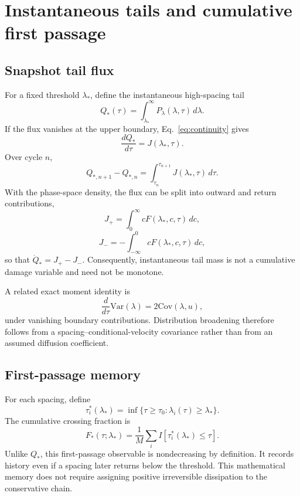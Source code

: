 \documentclass[11pt]{article}
\newcommand{\Var}{\mathrm{Var}}
\newcommand{\Cov}{\mathrm{Cov}}
\begin{document}
\section{Instantaneous tails and cumulative first passage}
\subsection{Snapshot tail flux}
For a fixed threshold \(\lambda_*\), define the instantaneous high-spacing tail
\begin{equation}
Q_*(\tau)=\int_{\lambda_*}^{\infty}P_\lambda(\lambda,\tau)\,d\lambda.
\end{equation}
If the flux vanishes at the upper boundary, Eq.~\eqref{eq:continuity} gives
\begin{equation}
\frac{dQ_*}{d\tau}=J(\lambda_*,\tau).
\label{eq:tailflux}
\end{equation}
Over cycle \(n\),
\begin{equation}
Q_{*,n+1}-Q_{*,n}
=\int_{\tau_n}^{\tau_{n+1}}J(\lambda_*,\tau)\,d\tau.
\label{eq:cycletail}
\end{equation}
With the phase-space density, the flux can be split into outward and return contributions,
\begin{equation}
J_+=\int_0^\infty cF(\lambda_*,c,\tau)\,dc,
\end{equation}
\begin{equation}
J_-=-\int_{-\infty}^0 cF(\lambda_*,c,\tau)\,dc,
\end{equation}
so that \(\dot Q_*=J_+-J_-\). Consequently, instantaneous tail mass is not a cumulative damage variable and need not be monotone.

A related exact moment identity is
\begin{equation}
\frac{d}{d\tau}\Var(\lambda)
=2\Cov(\lambda,u),
\end{equation}
under vanishing boundary contributions. Distribution broadening therefore follows from a spacing--conditional-velocity covariance rather than from an assumed diffusion coefficient.

\subsection{First-passage memory}
For each spacing, define
\begin{equation}
\tau_i^*(\lambda_*)
=\inf\{\tau\ge\tau_0:\lambda_i(\tau)\ge\lambda_*\}.
\end{equation}
The cumulative crossing fraction is
\begin{equation}
F_*(\tau;\lambda_*)
=\frac1M\sum_i I[\tau_i^*(\lambda_*)\le\tau].
\label{eq:firstpassfrac}
\end{equation}
Unlike \(Q_*\), this first-passage observable is nondecreasing by definition. It records history even if a spacing later returns below the threshold. This mathematical memory does not require assigning positive irreversible dissipation to the conservative chain.
\end{document}

